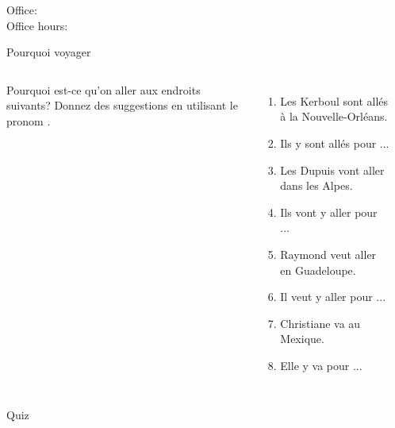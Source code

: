 \documentclass{beamer}
\subtitle[Transport et \lexi{y}]{Les moyens de transport et le pronom \lexi{y}}
\begin{document}
  \begin{frame}
    \titlepage
    \tiny{Office: \\
          Office hours: }
  \end{frame}

  \begin{frame}[t]{Pourquoi voyager}
    \begin{columns}
        \small
        Pourquoi est-ce qu'on aller aux endroits suivants? Donnez des suggestions en utilisant le pronom .
        \begin{enumerate}
          \item Les Kerboul sont allés à la Nouvelle-Orléans.
          \item<2->[$\to$] Ils \alert{y} sont allés pour ...
          \item<3-> Les Dupuis vont aller dans les Alpes.
          \item<4->[$\to$] Ils vont \alert{y} aller pour ...
          \item<5-> Raymond veut aller en Guadeloupe.
          \item<6->[$\to$] Il veut \alert{y} aller pour ...
          \item<7-> Christiane va au Mexique.
          \item<8->[$\to$] Elle \alert{y} va pour ...
        \end{enumerate}
        \begin{minipage}[c][0.8\textheight]{\linewidth}
          \begin{center}
          \end{center}
        \end{minipage}
    \end{columns}
  \end{frame}

  \begin{frame}{}
    \begin{center}
      \Large Quiz
    \end{center}
  \end{frame}
\end{document}
